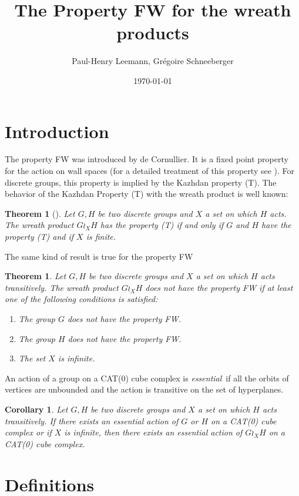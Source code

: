 \documentclass[a4paper]{article}
\title{The Property FW for the wreath products}
\author{Paul-Henry Leemann, Grégoire Schneeberger}
\date{\today \quad \currenttime}
\newtheorem{cor}[lem]{Corollary}
\newtheorem{thm}[lem]{Theorem}
\theoremstyle{remark}%
\begin{document}
\maketitle

\section{Introduction}
%
The property FW was introduced by de Cornullier. It is a fixed point property for the action on wall spaces (for a detailed treatment of this property see \cite{Cornulier2013}). For discrete groups, this property is implied by the Kazhdan property (T). The behavior of the Kazhdan Property (T) with the wreath product is well known: 
\begin{thm}[\cite{Cherix2004,Neuhauser2005a}] \label{T:Wreath_prop_T}
Let $G,H$ be two discrete groups and $X$ a set on which $H$ acts. The wreath product $G \wr_X H$ has the property (T) if and only if $G$ and $H$ have the property (T) and if $X$ is finite.
\end{thm}
%
%
The same kind of result is true for the property FW
\begin{thm}
Let $G,H$ be two discrete groups and $X$ a set on which $H$ acts transitively. The wreath product $G \wr_X H$ does not have the property FW if at least one of the following conditions is satisfied: 
\begin{enumerate}
\item The group $G$ does not have the property FW.
\item The group $H$ does not have the property FW.
\item The set $X$ is infinite.
\end{enumerate}
\end{thm}
%
%
An action of a group on a CAT(0) cube complex is \emph{essential} if all the orbits of vertices are unbounded and the action is transitive on the set of hyperplanes.
\begin{cor}
Let $G,H$ be two discrete groups and $X$ a set on which $H$ acts transitively. If there exists an essential action of $G$ or $H$ on a CAT(0) cube complex  or if $X$ is infinite, then there exists an essential action of $G \wr_X H$ on a CAT(0) cube complex. 
\end{cor}
%
%

%
%
\section{Definitions}
\end{document}
